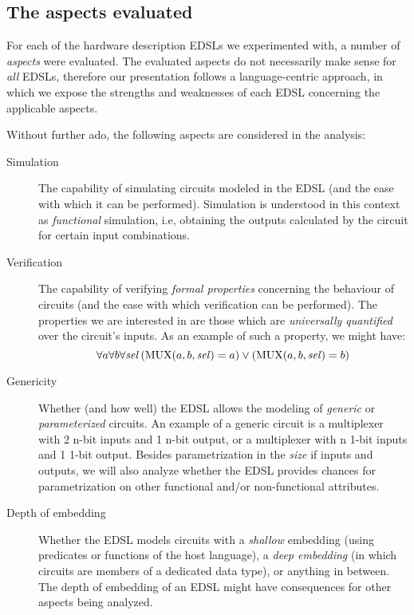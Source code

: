     \subsection{The aspects evaluated}
    \label{subsec:aspects}

        For each of the hardware description EDSLs we experimented with, a number of \emph{aspects}
        were evaluated. The evaluated aspects do not necessarily make sense for \emph{all} EDSLs,
        therefore our presentation follows a language-centric approach, in which we expose the
        strengths and weaknesses of each EDSL concerning the applicable aspects.

        Without further ado, the following aspects are considered in the analysis:

        \begin{description}

            \item[Simulation] The capability of simulating circuits modeled in the EDSL (and the
            ease with which it can be performed). Simulation is understood in this context as
            \emph{functional} simulation, i.e, obtaining the outputs calculated by the circuit for
            certain input combinations.

            \item[Verification] The capability of verifying \emph{formal properties} concerning the
            behaviour of circuits (and the ease with which verification can be performed). The
            properties we are interested in are those which are \emph{universally quantified} over
            the circuit's inputs. As an example of such a property, we might have: \[ \forall a
            \forall b \forall \text{\textit{sel}} \left( \text{MUX}(a,b,\text{\textit{sel}}) = a
            \right) \vee \left( \text{MUX}(a,b,\text{\textit{sel}}) = b \right) \]

            \item[Genericity] Whether (and how well) the EDSL allows the modeling of \emph{generic}
            or \emph{parameterized} circuits. An example of a generic circuit is a multiplexer with
            2 n-bit inputs and 1 n-bit output, or a multiplexer with n 1-bit inputs and 1 1-bit
            output. Besides parametrization in the \emph{size} if inputs and outputs, we will also
            analyze whether the EDSL provides chances for parametrization on other functional and/or
            non-functional attributes.

            \item[Depth of embedding] Whether the EDSL models circuits with a \emph{shallow}
            embedding (using predicates or functions of the host language), a \emph{deep embedding}
            (in which circuits are members of a dedicated data type), or anything in between. The
            depth of embedding of an EDSL might have consequences for other aspects being analyzed.


\end{description}
